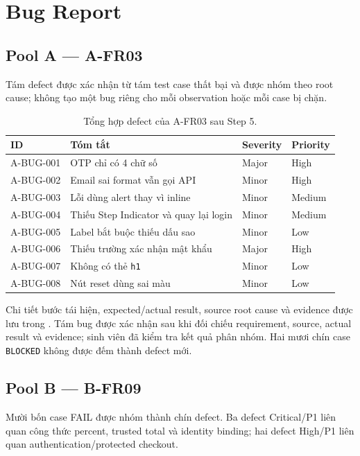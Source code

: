 \chapter{Bug Report}

\section{Pool A --- A-FR03}

Tám defect được xác nhận từ tám test case thất bại và được nhóm theo root cause;
không tạo một bug riêng cho mỗi observation hoặc mỗi case bị chặn.

\begin{table}[H]
  \centering
  \small
  \begin{tabular}{p{}p{}p{}p{}}
    \toprule
    ID & Tóm tắt & Severity & Priority \\
    \midrule
    A-BUG-001 & OTP chỉ có 4 chữ số & Major & High \\
    A-BUG-002 & Email sai format vẫn gọi API & Minor & High \\
    A-BUG-003 & Lỗi dùng alert thay vì inline & Minor & Medium \\
    A-BUG-004 & Thiếu Step Indicator và quay lại login & Minor & Medium \\
    A-BUG-005 & Label bắt buộc thiếu dấu sao & Minor & Low \\
    A-BUG-006 & Thiếu trường xác nhận mật khẩu & Major & High \\
    A-BUG-007 & Không có thẻ \texttt{h1} & Minor & Low \\
    A-BUG-008 & Nút reset dùng sai màu & Minor & Low \\
    \bottomrule
  \end{tabular}
  \caption{Tổng hợp defect của A-FR03 sau Step 5.}
\end{table}

Chi tiết bước tái hiện, expected/actual result, source root cause và evidence
được lưu trong . Tám bug được xác nhận sau khi
đối chiếu requirement, source, actual result và evidence; sinh viên đã kiểm tra
kết quả phân nhóm. Hai mươi chín case \texttt{BLOCKED} không được đếm thành
defect mới.

\section{Pool B --- B-FR09}

Mười bốn case FAIL được nhóm thành chín defect. Ba defect Critical/P1 liên quan
công thức percent, trusted total và identity binding; hai defect High/P1 liên
quan authentication/protected checkout.

